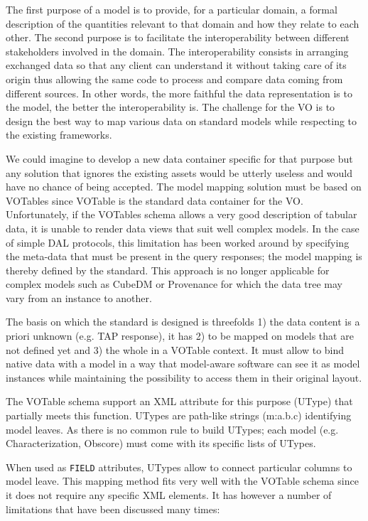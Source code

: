 
The first purpose of a model is to provide, for a particular domain, a formal description of the quantities relevant to that domain and how they relate to each other.
The second purpose is to facilitate the interoperability between  different stakeholders involved in the domain. The interoperability consists in arranging exchanged data 
so that any client can understand it without taking care of its origin thus allowing the same code to process and compare data coming from different sources.  
In other words, the more faithful the data representation is to the model, the better the interoperability is.
The challenge for the VO is to design the best way to map various data on standard models while respecting to the existing frameworks.

We could imagine to develop a new data container specific for that purpose but any solution that ignores the existing assets would be utterly useless and would have no chance of being accepted.
The model mapping solution must be based on VOTables since VOTable  \citep{2019ivoa.spec.1021O} is the standard data container for the VO.
Unfortunately, if the VOTables schema allows a very good description of tabular data, it is unable to render data views that suit well complex models.
In the case of simple DAL protocols, this limitation has been worked around by specifying the meta-data that must be present in the query responses; the model mapping is thereby defined by the standard.
This approach is no longer applicable for complex models such as CubeDM or Provenance for which the data tree may vary from an instance to another.

The basis on which the standard is designed is threefolds 1) the data content is a priori unknown (e.g. TAP response), it has 2) to be mapped on models that are not defined yet and 3) the whole in a VOTable context.
It must allow to bind native data with a model in a way that model-aware software can see it as 
model instances while maintaining the possibility to access them in their original layout.

The VOTable schema support an XML attribute for this purpose (UType) that partially meets this function. 
UTypes are path-like strings (m:a.b.c) identifying model leaves. As there is no common rule to build UTypes; each model (e.g. Characterization, Obscore)  must come with its specific lists of UTypes. 

When used as \texttt{FIELD} attributes, UTypes allow to connect particular columns to model leave. This mapping method fits very well with the VOTable schema since it does not require any specific XML elements. It has however a number of limitations that have been discussed many times:

